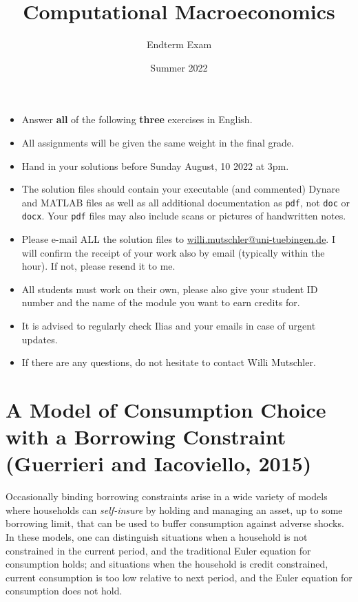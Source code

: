 \documentclass{article}
\begin{document}
	
\title{Computational Macroeconomics}
\author{Endterm Exam}
\date{Summer 2022}
\maketitle


\begin{itemize}
    \item Answer \textbf{all} of the following \textbf{three} exercises in English.
    \item All assignments will be given the same weight in the final grade.
    \item Hand in your solutions before Sunday August, 10 2022 at 3pm.
    \item The solution files should contain your executable (and commented) Dynare and MATLAB files
        as well as all additional documentation as \texttt{pdf}, not \texttt{doc} or \texttt{docx}.
    Your \texttt{pdf} files may also include scans or pictures of handwritten notes.
    \item Please e-mail ALL the solution files to \url{willi.mutschler@uni-tuebingen.de}.
    I will confirm the receipt of your work also by email (typically within the hour). If not, please resend it to me.
    \item All students must work on their own, please also give your student ID number and the name of the module you want to earn credits for.
    \item It is advised to regularly check Ilias and your emails in case of urgent updates.
    \item If there are any questions, do not hesitate to contact Willi Mutschler.
\end{itemize}

\newpage

\section[A Model of Consumption Choice with a Borrowing Constraint (Guerrieri and Iacoviello, 2015)]{A Model of Consumption Choice with a Borrowing Constraint (Guerrieri and Iacoviello, 2015)\label{ex:Guerrieri_Iacoviello_2015_borrcon}}
Occasionally binding borrowing constraints arise in a wide variety of models where households can \emph{self-insure} by holding and managing an asset,
  up to some borrowing limit, that can be used to buffer consumption against adverse shocks.
In these models, one can distinguish situations when a household is not constrained in the current period,
  and the traditional Euler equation for consumption holds;
  and situations when the household is credit constrained,
  current consumption is too low relative to next period,
  and the Euler equation for consumption does not hold.
\end{document}
